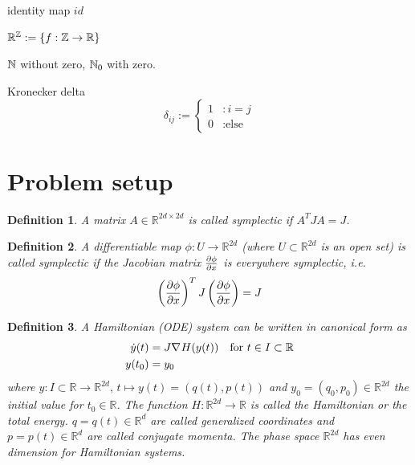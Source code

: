 \documentclass[twoside,a4paper]{article}
\newtheorem{definition}{Definition}
\begin{document}
identity map $id$

$\mathbb{R}^{\mathbb{Z}} := \{ f : \mathbb{Z} \to \mathbb{R} \}$

$\mathbb{N}$ without zero, $\mathbb{N}_0$ with zero.

Kronecker delta
\begin{equation*}
	\delta_{ij} := \begin{cases}
		1 &: i = j \\
		0 &: \text{else}
	\end{cases}
\end{equation*}


%
%
\newpage
\section{Problem setup}

\begin{definition}
	A matrix $A \in \mathbb{R}^{2d \times 2d}$ is called symplectic if $A^TJA=J$.
\end{definition}

\begin{definition}
	A differentiable map $\phi : U \to \mathbb{R}^{2d}$ (where $U \subset \mathbb{R}^{2d}$ is an open set)
	is called symplectic if the Jacobian matrix $\frac{\partial \phi}{\partial x}$ is everywhere symplectic, i.e.
	\begin{equation*}
		\left( \frac{\partial \phi}{\partial x} \right)^T J \left( \frac{\partial \phi}{\partial x} \right) = J
	\end{equation*}
\end{definition}

\begin{definition}
	A Hamiltonian (ODE) system can be written in canonical form as
	\begin{align*}
		\dot{y}(t) &= J \nabla_{}{H}(y(t)) \quad \text{for } t \in I \subset \mathbb{R} \\
		y(t_0) &= y_0
	\end{align*}
	where $y: I \subset \mathbb{R} \to \mathbb{R}^{2d},\, t \mapsto y(t) = (q(t),p(t))$ and 
	$y_0 = (q_0, p_0) \in \mathbb{R}^{2d}$ the initial value for $t_0 \in \mathbb{R}$. 
	The function $H: \mathbb{R}^{2d} \to \mathbb{R}$ is called the Hamiltonian 
	or the total energy. $q = q(t) \in \mathbb{R}^d$ are called generalized coordinates
	and $p=p(t) \in \mathbb{R}^d$ are called conjugate momenta. 
	The phase space $\mathbb{R}^{2d}$ has even dimension for Hamiltonian systems.
\end{definition}
\end{document}
